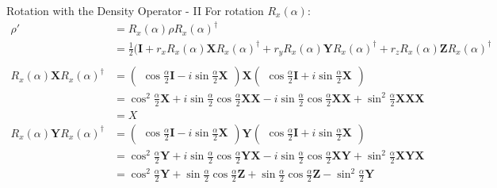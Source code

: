 \documentclass{beamer}
\begin{document}
\begin{frame}{Rotation with the Density Operator - II}
  {\tiny
    For rotation $R_x(\alpha)$:
    \begin{align*}
      \rho' &= R_x(\alpha) \rho R_x(\alpha)^{\dagger} \\
            &= \frac{1}2(\mathbf{I}  + r_x R_x(\alpha) \mathbf{X} R_x(\alpha)^{\dagger}
                                     + r_y R_x(\alpha) \mathbf{Y} R_x(\alpha)^{\dagger} 
                                     + r_z R_x(\alpha) \mathbf{Z} R_x(\alpha)^{\dagger} \\
      \\
      R_x(\alpha) \mathbf{X} R_x(\alpha)^{\dagger}
            &=  \begin{pmatrix} \cos\frac{\alpha}2\mathbf{I} - i\sin\frac{\alpha}2 \mathbf{X} \end{pmatrix}
                \mathbf{X}
                \begin{pmatrix} \cos\frac{\alpha}2\mathbf{I} + i\sin\frac{\alpha}2 \mathbf{X} \end{pmatrix} \\
            &=    \cos^2\frac{\alpha}2 \mathbf{X}
                + i\sin\frac{\alpha}2 \cos\frac{\alpha}2 \mathbf{X}\mathbf{X}
                - i\sin\frac{\alpha}2 \cos\frac{\alpha}2 \mathbf{X}\mathbf{X}
                + \sin^2\frac{\alpha}2 \mathbf{X}\mathbf{X}\mathbf{X} \\
            &= X \\
      R_x(\alpha) \mathbf{Y} R_x(\alpha)^{\dagger}
            &=  \begin{pmatrix} \cos\frac{\alpha}2\mathbf{I} - i\sin\frac{\alpha}2 \mathbf{X} \end{pmatrix}
                \mathbf{Y}
                \begin{pmatrix} \cos\frac{\alpha}2\mathbf{I} + i\sin\frac{\alpha}2 \mathbf{X} \end{pmatrix} \\
            &=    \cos^2\frac{\alpha}2 \mathbf{Y}
                + i\sin\frac{\alpha}2 \cos\frac{\alpha}2 \mathbf{Y}\mathbf{X}
                - i\sin\frac{\alpha}2 \cos\frac{\alpha}2 \mathbf{X}\mathbf{Y}
                + \sin^2\frac{\alpha}2 \mathbf{X}\mathbf{Y}\mathbf{X} \\
            &=    \cos^2\frac{\alpha}2 \mathbf{Y}
                + \sin\frac{\alpha}2 \cos\frac{\alpha}2 \mathbf{Z}
                + \sin\frac{\alpha}2 \cos\frac{\alpha}2 \mathbf{Z}
                - \sin^2\frac{\alpha}2 \mathbf{Y} \\

\end{align*}}
\end{frame}
\end{document}

